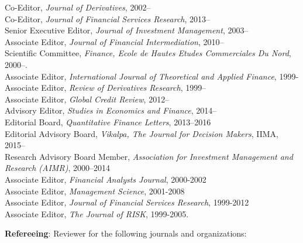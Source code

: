 \documentclass{article}
\begin{document}
\begin{description}

\item[PROFESSIONAL SERVICE] \mbox{}

\item[Editorial and Advisory Positions] \mbox{}

Co-Editor, {\it Journal of Derivatives}, 2002--\\
Co-Editor, {\it Journal of Financial Services Research}, 2013--\\
Senior Executive Editor, {\it Journal of Investment Management}, 2003--\\
Associate Editor, {\it Journal of Financial Intermediation}, 2010--\\ 
Scientific Committee, {\it Finance, Ecole de Hautes Etudes Commerciales
  Du Nord}, 2000--.\\
Associate Editor, {\it International Journal of Theoretical and Applied Finance}, 1999-\\
Associate Editor, {\it Review of Derivatives Research}, 1999--\\
Associate Editor, {\it Global Credit Review}, 2012--\\
Advisory Editor, {\it Studies in Economics and Finance}, 2014--\\
Editorial Board, {\it Quantitative Finance Letters}, 2013--2016\\
Editorial Advisory Board, {\it Vikalpa, The Journal for Decision Makers}, IIMA, 2015--\\
Research Advisory Board Member, {\it Association for Investment
Management and Research (AIMR)}, 2000--2014\\
Associate Editor, {\it Financial Analysts Journal}, 2000-2002\\
Associate Editor, {\it Management Science}, 2001-2008\\
Associate Editor, {\it Journal of Financial Services Research}, 1999-2012\\
Associate Editor, {\it The Journal of RISK}, 1999-2005.\\



\item {\bf Refereeing}: Reviewer for the following journals and
organizations:


\end{description}
\end{document}

